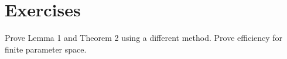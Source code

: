 

\section{Exercises}
Prove Lemma 1 and Theorem 2 using a different method.
Prove efficiency for finite parameter space.